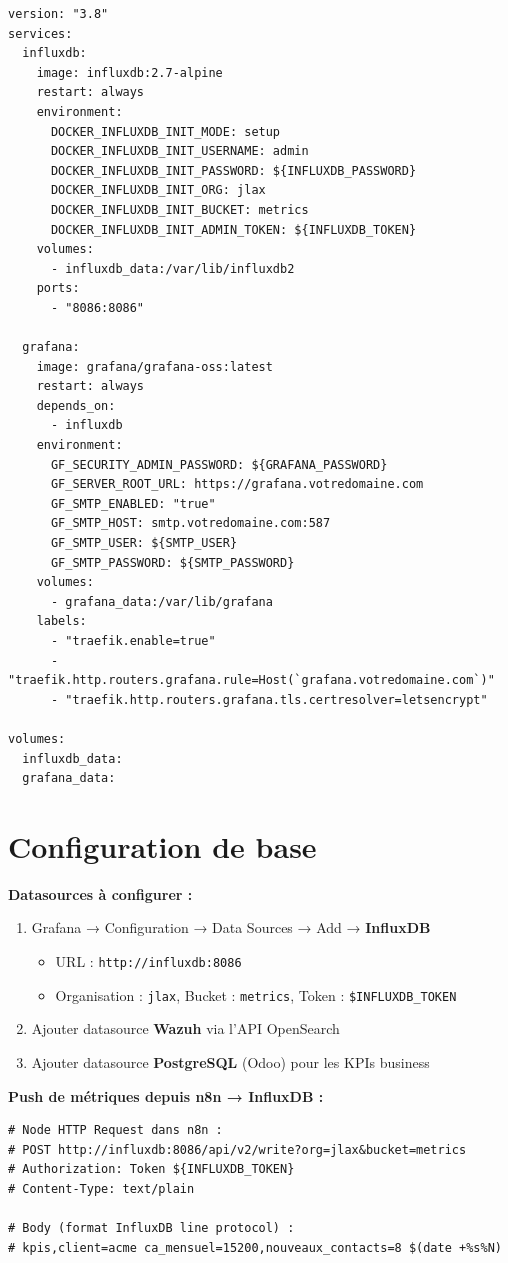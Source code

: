 \documentclass[11pt, a4paper]{article}
\begin{document}
\begin{lstlisting}[style=yamlstyle, caption={docker-compose.yml — Grafana + InfluxDB}]
version: "3.8"
services:
  influxdb:
    image: influxdb:2.7-alpine
    restart: always
    environment:
      DOCKER_INFLUXDB_INIT_MODE: setup
      DOCKER_INFLUXDB_INIT_USERNAME: admin
      DOCKER_INFLUXDB_INIT_PASSWORD: ${INFLUXDB_PASSWORD}
      DOCKER_INFLUXDB_INIT_ORG: jlax
      DOCKER_INFLUXDB_INIT_BUCKET: metrics
      DOCKER_INFLUXDB_INIT_ADMIN_TOKEN: ${INFLUXDB_TOKEN}
    volumes:
      - influxdb_data:/var/lib/influxdb2
    ports:
      - "8086:8086"

  grafana:
    image: grafana/grafana-oss:latest
    restart: always
    depends_on:
      - influxdb
    environment:
      GF_SECURITY_ADMIN_PASSWORD: ${GRAFANA_PASSWORD}
      GF_SERVER_ROOT_URL: https://grafana.votredomaine.com
      GF_SMTP_ENABLED: "true"
      GF_SMTP_HOST: smtp.votredomaine.com:587
      GF_SMTP_USER: ${SMTP_USER}
      GF_SMTP_PASSWORD: ${SMTP_PASSWORD}
    volumes:
      - grafana_data:/var/lib/grafana
    labels:
      - "traefik.enable=true"
      - "traefik.http.routers.grafana.rule=Host(`grafana.votredomaine.com`)"
      - "traefik.http.routers.grafana.tls.certresolver=letsencrypt"

volumes:
  influxdb_data:
  grafana_data:
\end{lstlisting}

\section{Configuration de base}

\textbf{Datasources à configurer :}
\begin{enumerate}
  \item Grafana → Configuration → Data Sources → Add → \textbf{InfluxDB}
    \begin{itemize}
      \item URL : \texttt{http://influxdb:8086}
      \item Organisation : \texttt{jlax}, Bucket : \texttt{metrics}, Token : \texttt{\$INFLUXDB\_TOKEN}
    \end{itemize}
  \item Ajouter datasource \textbf{Wazuh} via l'API OpenSearch
  \item Ajouter datasource \textbf{PostgreSQL} (Odoo) pour les KPIs business
\end{enumerate}

\textbf{Push de métriques depuis n8n → InfluxDB :}
\begin{lstlisting}[style=terminal, caption={Workflow n8n : push métrique InfluxDB}]
# Node HTTP Request dans n8n :
# POST http://influxdb:8086/api/v2/write?org=jlax&bucket=metrics
# Authorization: Token ${INFLUXDB_TOKEN}
# Content-Type: text/plain

# Body (format InfluxDB line protocol) :
# kpis,client=acme ca_mensuel=15200,nouveaux_contacts=8 $(date +%s%N)
\end{lstlisting}
\end{document}
